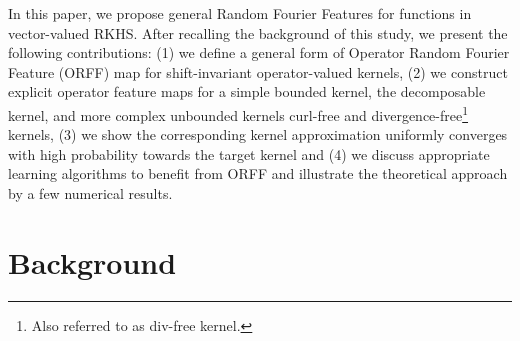 \documentclass[twocolumn]{article}
\begin{document}
In this paper, we propose general Random Fourier Features for functions in
vector-valued RKHS. After recalling the background of this study, we present
the following contributions: (1) we define a general form of Operator Random
Fourier Feature (ORFF) map for shift-invariant operator-valued kernels, (2) we
construct explicit operator feature maps for a simple bounded kernel, the
decomposable kernel, and more complex unbounded kernels curl-free and
divergence-free\footnote{Also referred to as div-free kernel.} kernels, (3) we
show the corresponding kernel approximation uniformly converges with high
probability towards the target kernel and (4) we discuss appropriate learning
algorithms to benefit from ORFF and illustrate the theoretical approach by a
few numerical results.

\section{Background}
\label{sec:background}
\end{document}
